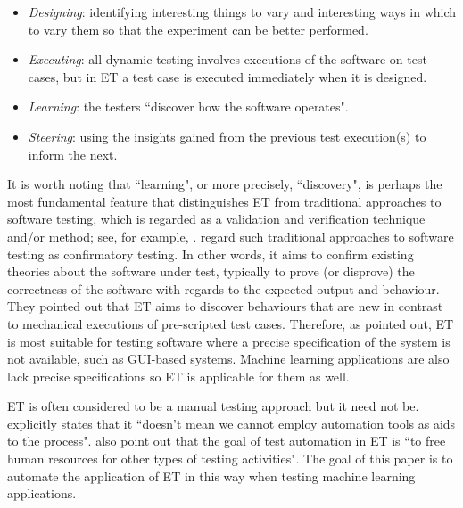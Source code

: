 \documentclass[preprint,1p,authoryear,times]{elsarticle}
\begin{document}
\begin{itemize}
\item \emph{Designing}: identifying interesting things to vary and interesting ways in which to vary them so that the experiment can be better performed. 
\item \emph{Executing}: all dynamic testing involves executions of the software on test cases, but in ET a test case is executed immediately when it is designed. 
\item \emph{Learning}: the testers ``discover how the software operates". 
\item \emph{Steering}: using the insights gained from the previous test execution(s) to inform the next. 
\end{itemize}

It is worth noting that ``learning", or more precisely, ``discovery", is perhaps the most fundamental feature that distinguishes ET from traditional approaches to software testing, which is regarded as a validation and verification technique and/or method; see, for example, \citep{KungZhu2009}. \citet{Itkonen_et_al2016} regard such traditional approaches to software testing as confirmatory testing. In other words, it aims to confirm existing theories about the software under test, typically to prove (or disprove) the correctness of the software with regards to the expected output and behaviour. They pointed out that ET aims to discover behaviours that are new in contrast to mechanical executions of pre-scripted test cases. Therefore, as \citet{whittaker2009exploratory} pointed out, ET is most suitable for testing software where a precise specification of the system is not available, such as GUI-based systems. Machine learning applications are also lack precise specifications so ET is applicable for them as well. 

ET is often considered to be a manual testing approach but it need not be. \citet{whittaker2009exploratory} explicitly states that it ``doesn't mean we cannot employ automation tools as aids to the process". \citet{Itkonen_et_al2016} also point out that the goal of test automation in ET is ``to free human resources for other types of testing activities". The goal of this paper is to automate the application of ET in this way when testing machine learning applications. 
\end{document}
